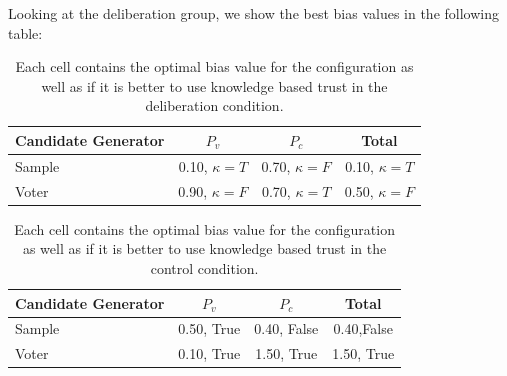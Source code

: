 Looking at the deliberation group, we show the best bias values in the following table:
\begin{table}
	\begin{center}
		\begin{tabular}{lccc}
			\toprule
			Candidate Generator & $P_{v}$            & $P_{c}$           & Total             \\
			\midrule
			Sample              & 0.10, $\kappa = T$ & 0.70, $\kappa =F$ & 0.10, $\kappa =T$ \\
			Voter               & 0.90, $\kappa =F$  & 0.70, $\kappa =T$ & 0.50, $\kappa =F$ \\
			\bottomrule
		\end{tabular}
		\caption{Each cell contains the optimal bias value for the configuration as well as if it is better to use knowledge based trust in the deliberation condition.}\label{tab:opt_delib}
	\end{center}
\end{table}
\begin{table}
	\begin{center}
		\begin{tabular}{lccc}
			\toprule
			Candidate Generator & $P_{v}$    & $P_{c}$     & Total      \\
			\midrule
			Sample              & 0.50, True & 0.40, False & 0.40,False \\
			Voter               & 0.10, True & 1.50, True  & 1.50, True \\
			\bottomrule
		\end{tabular}
		\caption{Each cell contains the optimal bias value for the configuration as well as if it is better to use knowledge based trust in the control condition.}\label{tab:opt_control}
	\end{center}
\end{table}


